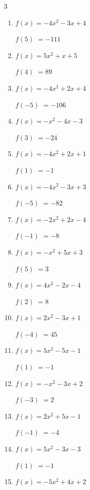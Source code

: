 \begin{multicols}{3}
\begin{enumerate}
$f(-2)$
        $= 34$

\columnbreak %

  \item $f(x)=-4x^{2}-3x+4$

$f(5)$
        $= -111$

  \item $f(x)=5x^{2}+x+5$

$f(4)$
        $= 89$

  \item $f(x)=-4x^{2}+2x+4$

$f(-5)$
        $= -106$

  \item $f(x)=-x^{2}-4x-3$

$f(3)$
        $= -24$

  \item $f(x)=-4x^{2}+2x+1$

$f(1)$
        $= -1$

  \item $f(x)=-4x^{2}-3x+3$

$f(-5)$
        $= -82$

  \item $f(x)=-2x^{2}+2x-4$

$f(-1)$
        $= -8$

  \item $f(x)=-x^{2}+5x+3$

$f(5)$
        $= 3$

  \item $f(x)=4x^{2}-2x-4$

$f(2)$
        $= 8$

  \item $f(x)=2x^{2}-3x+1$

$f(-4)$
        $= 45$

  \item $f(x)=5x^{2}-5x-1$

$f(1)$
        $= -1$

  \item $f(x)=-x^{2}-3x+2$

$f(-3)$
        $= 2$

  \item $f(x)=2x^{2}+5x-1$

$f(-1)$
        $= -4$

  \item $f(x)=5x^{2}-3x-3$

$f(1)$
        $= -1$

  \item $f(x)=-5x^{2}+4x+2$


\end{enumerate}
\end{multicols}
